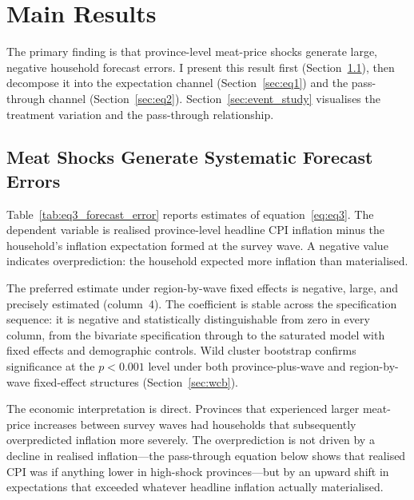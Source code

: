
\section{Main Results}\label{sec:results}

The primary finding is that province-level meat-price shocks
generate large, negative household forecast errors.
I present this result first (Section~\ref{sec:eq3}), then
decompose it into the expectation channel
(Section~\ref{sec:eq1}) and the pass-through channel
(Section~\ref{sec:eq2}).
Section~\ref{sec:event_study} visualises the treatment variation
and the pass-through relationship.

\subsection{Meat Shocks Generate Systematic Forecast Errors}%
\label{sec:eq3}



Table~\ref{tab:eq3_forecast_error} reports estimates of
equation~\eqref{eq:eq3}.
The dependent variable is realised province-level headline CPI
inflation minus the household's inflation expectation formed at
the survey wave.
A negative value indicates overprediction: the household expected
more inflation than materialised.

The preferred estimate under region-by-wave fixed effects
is negative, large, and precisely estimated (column~4).
The coefficient is stable across the specification sequence:
it is negative and statistically distinguishable from zero
in every column, from the bivariate specification through to
the saturated model with fixed effects and demographic controls.
Wild cluster bootstrap confirms significance at the $p < 0.001$
level under both province-plus-wave and region-by-wave fixed-effect
structures (Section~\ref{sec:wcb}).

The economic interpretation is direct.
Provinces that experienced larger meat-price increases between
survey waves had households that subsequently overpredicted
inflation more severely.
The overprediction is not driven by a decline in realised
inflation---the pass-through equation below shows that realised
CPI was if anything lower in high-shock provinces---but by an
upward shift in expectations that exceeded whatever headline
inflation actually materialised.

